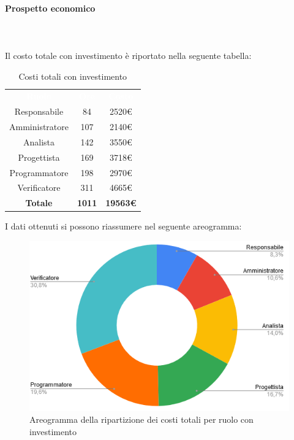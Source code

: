 \paragraph{Prospetto economico} \mbox{} \\ \mbox{} \\
Il costo totale con investimento è riportato nella seguente tabella:

\begin{table}[H]
\centering\renewcommand{\arraystretch}{1.5}
\caption{Costi totali con investimento}
\vspace{0.2cm}
\begin{tabular}{ c c c }
\rowcolor{redafk}
\textcolor{white}{\textbf{Ruolo}} & \textcolor{white}{\textbf{Ore}} & 
\textcolor{white}{\textbf{Costo}}  \\
Responsabile & 84 & 2520€ \\
Amministratore & 107 & 2140€ \\
Analista & 142 & 3550€ \\
Progettista	& 169 & 3718€ \\
Programmatore & 198 & 2970€  \\
Verificatore & 311 & 4665€  \\
\rowcolor{lastrowcolor}
\textbf{Totale} & \textbf{1011} & \textbf{19563€}  \\
\end{tabular}
\end{table}

I dati ottenuti si possono riassumere nel seguente areogramma:
\begin{figure}[H]
\centering
\includegraphics[scale=0.60]{img/grafici/torta_tot_con_analisi.png}
\caption{Areogramma della ripartizione dei costi totali per ruolo con investimento}
\end{figure}

